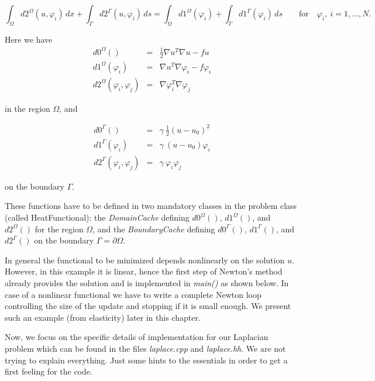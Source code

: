 \documentclass[11pt]{article}
\begin{document}
\begin{equation}\label{weakFunc}
  \int_{\Omega} d2^{\Omega}(u,\varphi_i) \, dx + \int_{\Gamma} d2^{\Gamma}(u,\varphi_i) \, ds = 
  \int_{\Omega} d1^{\Omega}(\varphi_i) + \int_{\Gamma} d1^{\Gamma}(\varphi_i)\,ds   \quad\quad \mbox{for}\quad \varphi_i,\ i=1,\dots,N.
\end{equation}

\noindent Here we have 
\begin{eqnarray}{}
d0^{\Omega}() &=& \frac{1}{2} \nabla u^T \nabla u  -  f u\\
d1^{\Omega}(\varphi_i) &=& \nabla u^T \nabla \varphi_i - f \varphi_i \\
d2^{\Omega}(\varphi_i,\varphi_j) &=& \nabla \varphi_i^T \nabla \varphi_j
\end{eqnarray}

\noindent in the region $\Omega$, and 

\begin{eqnarray}{}
d0^{\Gamma}() &=& \gamma \ \frac{1}{2} (u - u_0)^2\\
d1^{\Gamma}(\varphi_i) &=& \gamma \ (u - u_0) \varphi_i \\
d2^{\Gamma}(\varphi_i,\varphi_j) &=& \gamma \ \varphi_i  \varphi_j
\end{eqnarray}

\noindent on the boundary $\Gamma$.

These functions have to be defined in two mandatory classes in the problem class
(called HeatFunctional):
the {\em DomainCache} defining $d0^{\Omega}()$, $d1^{\Omega}()$, and $d2^{\Omega}()$ for the region $\Omega$, and the 
{\em BoundaryCache} defining $d0^{\Gamma}()$, $d1^{\Gamma}()$, and $d2^{\Gamma}()$ on the boundary $\Gamma = \partial \Omega$.

In general the functional to be minimized depends nonlinearly on the solution $u$.
However, in this example it is linear, hence the first step of  Newton's method already
provides the solution and is implemented in {\em main()} as shown below. In case of a nonlinear
functional we have to write a complete Newton loop controlling the size of the update and stopping
if it is small enough. We present such an example (from elasticity) later in this chapter.


Now, we focus on the specific details of implementation for our Laplacian problem which can be
found in the files {\em laplace.cpp} and {\em laplace.hh}.
We are not trying to explain everything. Just some hints to the essentials in order to get a first
feeling for the code.
\end{document}
